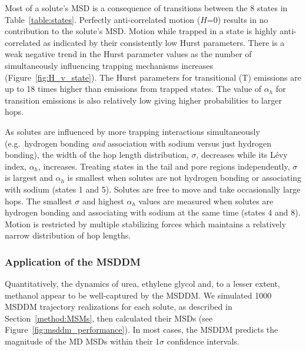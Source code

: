 \documentclass[journal=ancac3,manuscript=article,layout=twocolumn]{achemso}
\begin{document}
  Most of a solute's MSD is a consequence of transitions between the 8 states
  in Table~\ref{table:states}. Perfectly anti-correlated motion ($H$=0) results
  in no contribution to the solute's MSD. Motion while trapped in a state is
  highly anti-correlated as indicated by their consistently low Hurst
  parameters. There is a weak negative trend in the Hurst parameter values as
  the number of simultaneously influencing trapping mechanisms increases
  (Figure~\ref{fig:H_v_state}).  The Hurst parameters for transitional (T)
  emissions are up to 18 times higher than emissions from trapped states. The
  value of $\alpha_h$ for transition emissions is also relatively low giving
  higher probabilities to larger hops.
  
  As solutes are influenced by more trapping interactions simultaneously
  (e.g.~hydrogen bonding \textit{and} association with sodium versus just
  hydrogen bonding), the width of the hop length distribution, $\sigma$,
  decreases while its L\'evy index, $\alpha_h$, increases. Treating states in
  the tail and pore regions independently, $\sigma$ is largest and $\alpha_h$
  is smallest when solutes are not hydrogen bonding or associating with sodium
  (states 1 and 5). Solutes are free to move and take occasionally large hops.
  The smallest $\sigma$ and highest $\alpha_h$ values are measured when solutes
  are hydrogen bonding and associating with sodium at the same time (states 4
  and 8). Motion is restricted by multiple stabilizing forces which maintains a
  relatively narrow distribution of hop lengths.
  
  \subsubsection{Application of the MSDDM}\label{section:msddm_application}
  
  Quantitatively, the dynamics of urea, ethylene glycol and, to a lesser extent, 
  methanol appear to be well-captured by the MSDDM. We simulated 1000 MSDDM trajectory realizations
  for each solute, as described in Section~\ref{method:MSMs}, then calculated their
  MSDs (see Figure~\ref{fig:msddm_performance}). In most cases, the MSDDM predicts
  the magnitude of the MD MSDs within their 1$\sigma$ confidence intervals. 
 
\end{document}
